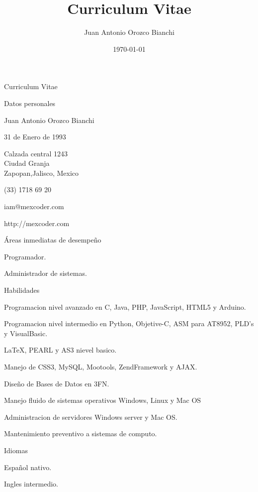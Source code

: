 \documentclass[letterpaper,12pt]{article}
\title{Curriculum Vitae}
\author{Juan Antonio Orozco Bianchi}
\date{\today}
\newcommand{\CPP}
{C\nolinebreak[4]\hspace{-.05em}\raisebox{.22ex}{\footnotesize\bf ++}}
\begin{document}
\setlength{\cvlabelwidth}{40mm}  %

\begin{cv}{Curriculum Vitae}

\begin{cvlist}{Datos personales}
        \item[Nombre completo] Juan Antonio Orozco Bianchi
        \item[Fecha de nacimiento] 31 de Enero de 1993
        \item[Domicilio] Calzada central 1243\\
                Ciudad Granja\\
                Zapopan,Jalisco, Mexico
        \item[Teléfono celular] (33) 1718 69 20
        \item[Correo electrónico] iam@mexcoder.com
        \item[Sitio web] http://mexcoder.com
\end{cvlist}

\begin{cvlist}{Áreas inmediatas de desempeño}
        \item Programador.
        \item Administrador de sistemas.
\end{cvlist}

\begin{cvlist}{Habilidades}
        \item Programacion nivel avanzado en \CPP, Java, PHP, JavaScript, HTML5 y Arduino.
        \item Programacion nivel intermedio en Python, Objetive-C, ASM para AT8952, PLD's y VisualBasic.
        \item \LaTeX{}, PEARL y AS3 nievel  basico.
        \item Manejo de CSS3, MySQL, Mootools, ZendFramework y AJAX.
        \item Diseño de Bases de Datos en 3FN.
        \item Manejo fluido de sistemas operativos Windows, Linux y Mac OS
        \item Administracion de servidores Windows server y Mac OS.
        \item Mantenimiento preventivo a sistemas de computo.
\end{cvlist}

\begin{cvlist}{Idiomas}
        \item Español nativo.
        \item Ingles intermedio.
\end{cvlist}


\end{cv}
\end{document}
